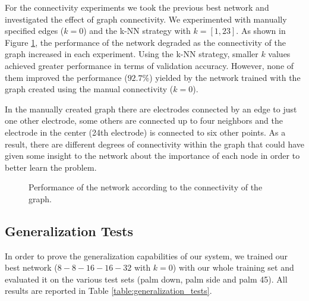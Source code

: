 For the connectivity experiments we took the previous best network and investigated the effect of graph connectivity. We experimented with manually specified edges ($k=0$) and the \ac{k-NN} strategy with $k = [1, 23]$. As shown in Figure \ref{fig:experiments_connectivity}, the performance of the network degraded as the connectivity of the graph increased in each experiment. Using the \ac{k-NN} strategy, smaller $k$ values achieved greater performance in terms of validation accuracy. However,
none of them improved the performance ($92.7\%$) yielded by the network trained with the graph created using the manual connectivity ($k = 0$).

In the manually created graph there are electrodes connected by an edge to just one other electrode, some others are connected up to four neighbors and the electrode in the center (24th electrode) is connected to six other points. As a result, there are different degrees of connectivity within the graph that could have given some insight to the network about the importance of each node in order to better learn the problem.

\begin{figure}[!htb]
  \caption{Performance of the network according to the connectivity of the graph.}
  \label{fig:experiments_connectivity}
\end{figure}

\subsection{Generalization Tests}

In order to prove the generalization capabilities of our system, we trained our best network ($8-8-16-16-32$ with $k=0$) with our whole training set and evaluated it on the various test sets (palm down, palm side and palm 45). All results are reported in Table \ref{table:generalization_tests}.

